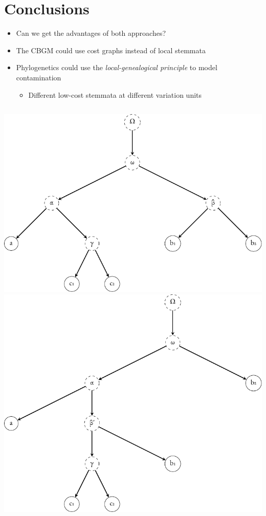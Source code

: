\documentclass[10pt]{beamer}
\begin{document}
	\section{Conclusions}
	\sectionframe
	\begin{frame}
		\begin{itemize}
			\item Can we get the advantages of both approaches?
			\item The CBGM could use cost graphs instead of local stemmata
			\item Phylogenetics could use the \emph{local-genealogical principle} to model contamination
			\begin{itemize}
				\item Different low-cost stemmata at different variation units
			\end{itemize}
		\end{itemize}
		\begin{center}
			\begin{columns}
				\begin{column}{0.3\textwidth}
					\centering
					\includegraphics[scale=0.25]{../img/gene-tree-rooted-site-1.pdf}\\
					\vspace{\baselineskip}
					\includegraphics[scale=0.25]{../img/gene-tree-rooted-site-2.pdf}

\end{column}
\end{columns}
\end{center}
\end{frame}
\end{document}
